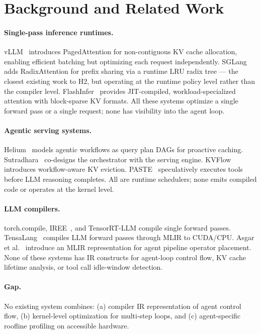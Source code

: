 \documentclass[10pt,twocolumn]{article}
\begin{document}
\section{Background and Related Work}
\label{sec:related}

\paragraph{Single-pass inference runtimes.}
vLLM~\cite{kwon2023vllm} introduces PagedAttention for non-contiguous KV cache
allocation, enabling efficient batching but optimizing each request independently.
SGLang~\cite{zheng2024sglang} adds RadixAttention for prefix sharing via a
runtime LRU radix tree — the closest existing work to H2, but operating at
the runtime policy level rather than the compiler level.
FlashInfer~\cite{ye2025flashinfer} provides JIT-compiled, workload-specialized
attention with block-sparse KV formats. All these systems optimize a single
forward pass or a single request; none has visibility into the agent loop.

\paragraph{Agentic serving systems.}
Helium~\cite{helium2026} models agentic workflows as query plan DAGs for
proactive caching. Sutradhara~\cite{sutradhara2026} co-designs the orchestrator
with the serving engine. KVFlow~\cite{kvflow2025} introduces workflow-aware KV
eviction. PASTE~\cite{paste2026} speculatively executes tools before LLM reasoning
completes. All are runtime schedulers; none emits compiled code or operates at
the kernel level.

\paragraph{LLM compilers.}
torch.compile, IREE~\cite{iree}, and TensorRT-LLM compile single forward passes.
TensaLang~\cite{tensalang} compiles LLM forward passes through MLIR to CUDA/CPU.
Asgar et al.~\cite{asgar2025} introduce an MLIR representation for agent pipeline
operator placement. None of these systems has IR constructs for agent-loop
control flow, KV cache lifetime analysis, or tool call idle-window detection.

\paragraph{Gap.}
No existing system combines: (a) compiler IR representation of agent control flow,
(b) kernel-level optimization for multi-step loops, and (c) agent-specific
roofline profiling on accessible hardware.
\end{document}
